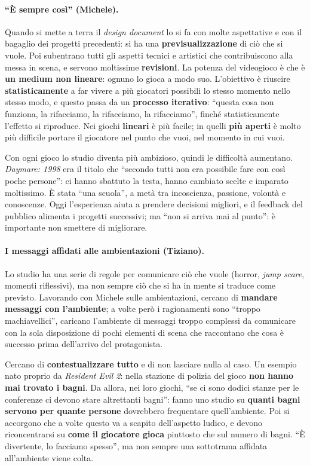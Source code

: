 \paragraph{``È sempre così'' (Michele).} Quando si mette a terra il
\emph{design document} lo si fa con molte aspettative e con il bagaglio dei
progetti precedenti: si ha una \textbf{previsualizzazione} di ciò che si vuole.
Poi subentrano tutti gli aspetti tecnici e artistici che contribuiscono alla
messa in scena, e servono moltissime \textbf{revisioni}. La potenza del
videogioco è che è \textbf{un medium non lineare}: ognuno lo gioca a modo suo.
L'obiettivo è riuscire \textbf{statisticamente} a far vivere a più giocatori
possibili lo stesso momento nello stesso modo, e questo passa da un
\textbf{processo iterativo}: ``questa cosa non funziona, la rifacciamo, la
rifacciamo, la rifacciamo'', finché statisticamente l'effetto si riproduce. Nei
giochi \textbf{lineari} è più facile; in quelli \textbf{più aperti} è molto più
difficile portare il giocatore nel punto che vuoi, nel momento in cui vuoi.

Con ogni gioco lo studio diventa più ambizioso, quindi le difficoltà aumentano.
\emph{Daymare: 1998} era il titolo che ``secondo tutti non era possibile fare con
così poche persone'': ci hanno sbattuto la testa, hanno cambiato scelte e
imparato moltissimo. È stata ``una scuola'', a metà tra incoscienza, passione,
volontà e conoscenze. Oggi l'esperienza aiuta a prendere decisioni migliori, e il
feedback del pubblico alimenta i progetti successivi; ma ``non si arriva mai al
punto'': è importante non smettere di migliorare.

\paragraph{I messaggi affidati alle ambientazioni (Tiziano).} Lo studio ha una
serie di regole per comunicare ciò che vuole (horror, \emph{jump scare}, momenti
riflessivi), ma non sempre ciò che si ha in mente si traduce come previsto.
Lavorando con Michele sulle ambientazioni, cercano di \textbf{mandare messaggi
con l'ambiente}; a volte però i ragionamenti sono ``troppo machiavellici'',
caricano l'ambiente di messaggi troppo complessi da comunicare con la sola
disposizione di pochi elementi di scena che raccontano che cosa è successo prima
dell'arrivo del protagonista.

Cercano di \textbf{contestualizzare tutto} e di non lasciare nulla al caso. Un
esempio nato proprio da \emph{Resident Evil 2}: nella stazione di polizia del
gioco \textbf{non hanno mai trovato i bagni}. Da allora, nei loro giochi, ``se
ci sono dodici stanze per le conferenze ci devono stare altrettanti bagni'': fanno
uno studio su \textbf{quanti bagni servono per quante persone} dovrebbero
frequentare quell'ambiente. Poi si accorgono che a volte questo va a scapito
dell'aspetto ludico, e devono riconcentrarsi su \textbf{come il giocatore gioca}
piuttosto che sul numero di bagni. ``È divertente, lo facciamo spesso'', ma non
sempre una sottotrama affidata all'ambiente viene colta.

